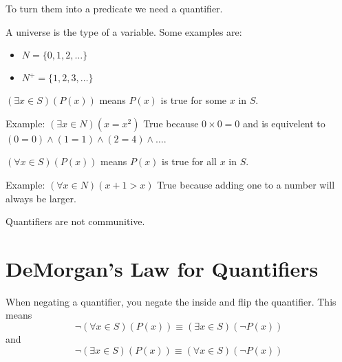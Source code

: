To turn them into a predicate we need a quantifier.

\begin{definition}[Universe]
  A universe is the type of a variable. Some examples are:
  \begin{itemize}
    \item $N = \{0, 1, 2, \ldots\}$
    \item $N^+ = \{1, 2, 3, \ldots\}$
  \end{itemize}
\end{definition}

\begin{definition}
  $(\exists x \in S)(P(x))$ means $P(x)$ is true for some $x$ in $S$.

  Example: $(\exists x \in N) (x = x^2)$
  True because $0\times 0 = 0$ and is equivelent to $(0=0) \land (1=1) \land(2=4)\land\ldots$.
\end{definition}

\begin{definition}
  $(\forall x \in S)(P(x))$ means $P(x)$ is true for all $x$ in $S$.

  Example: $(\forall x \in N) (x+1>x)$
  True because adding one to a number will always be larger.
\end{definition}

\begin{note}
  Quantifiers are not communitive.
\end{note}

\section{DeMorgan's Law for Quantifiers}

When negating a quantifier, you negate the inside and flip the quantifier.
This means
\begin{equation}
  \lnot (\forall x \in S)(P(x)) \equiv (\exists x \in S)(\lnot P(x))
\end{equation}
and
\begin{equation}
  \lnot (\exists x \in S)(P(x)) \equiv (\forall x \in S)(\lnot P(x))
\end{equation}
